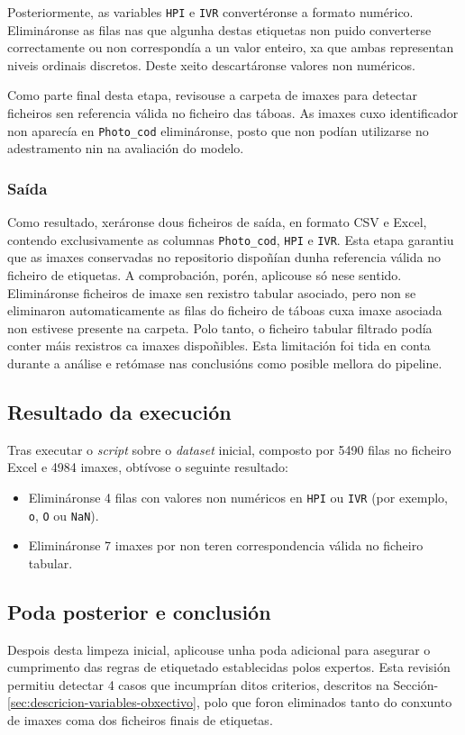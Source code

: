 Posteriormente, as variables \texttt{HPI} e \texttt{IVR} convertéronse a formato numérico. Elimináronse as filas nas que algunha destas etiquetas non puido converterse correctamente ou non correspondía a un valor enteiro, xa que ambas representan niveis ordinais discretos. Deste xeito descartáronse valores non numéricos.

Como parte final desta etapa, revisouse a carpeta de imaxes para detectar ficheiros sen referencia
válida no ficheiro das táboas. As imaxes cuxo identificador non aparecía en \texttt{Photo\_cod}
elimináronse, posto que non podían utilizarse no adestramento nin na avaliación do modelo.

\subsubsection{Saída}
Como resultado, xeráronse dous ficheiros de saída, en formato CSV e Excel, contendo exclusivamente
as columnas \texttt{Photo\_cod}, \texttt{HPI} e \texttt{IVR}. Esta etapa garantiu que as imaxes
conservadas no repositorio dispoñían dunha referencia válida no ficheiro de etiquetas. A comprobación,
porén, aplicouse só nese sentido. Elimináronse ficheiros de imaxe sen rexistro tabular asociado, pero
non se eliminaron automaticamente as filas do ficheiro de táboas cuxa imaxe asociada non estivese
presente na carpeta. Polo tanto, o ficheiro tabular filtrado podía conter máis rexistros ca imaxes
dispoñibles. Esta limitación foi tida en conta durante a análise e retómase nas conclusións como
posible mellora do pipeline.

\subsection{Resultado da execución}
Tras executar o \textit{script} sobre o \textit{dataset} inicial, composto por 5490 filas no
ficheiro Excel e 4984 imaxes, obtívose o seguinte resultado:
\begin{itemize}
    \item Elimináronse 4 filas con valores non numéricos en \texttt{HPI} ou \texttt{IVR} (por exemplo, \texttt{o}, \texttt{O} ou \texttt{NaN}).
    \item Elimináronse 7 imaxes por non teren correspondencia válida no ficheiro tabular.
\end{itemize}

\subsection{Poda posterior e conclusión}
Despois desta limpeza inicial, aplicouse unha poda adicional para asegurar o cumprimento das regras
de etiquetado establecidas polos expertos. Esta revisión permitiu detectar 4 casos que incumprían
ditos criterios, descritos na
Sección-\ref{sec:descricion-variables-obxectivo}, polo que foron eliminados tanto do conxunto de
imaxes coma dos ficheiros finais de etiquetas.

